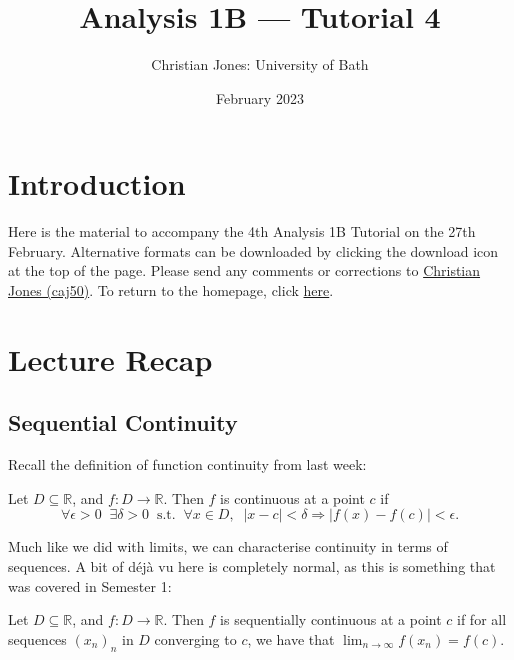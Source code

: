 \documentclass[
  10pt,
  a4paper]{article}
\title{Analysis 1B --- Tutorial 4}
\author{Christian Jones: University of Bath}
\date{February 2023}
\theoremstyle{plain}
\theoremstyle{definition}
\theoremstyle{plain}
\theoremstyle{plain}
\theoremstyle{plain}
\theoremstyle{plain}
\theoremstyle{definition}
\theoremstyle{definition}
\theoremstyle{remark}
\theoremstyle{remark}
\let\BeginKnitrBlock\begin \let\EndKnitrBlock\end
\begin{document}
\maketitle

{
\setcounter{tocdepth}{2}
\tableofcontents
}
\newpage
{}

\hypertarget{introduction}{%
\section*{Introduction}\label{introduction}}

Here is the material to accompany the 4th Analysis 1B Tutorial on the 27th February. Alternative formats can be downloaded by clicking the download icon at the top of the page. Please send any comments or corrections to \href{mailto:caj50@bath.ac.uk}{Christian Jones (caj50)}. To return to the homepage, click \href{http://caj50.github.io/tutoring.html}{here}.

\hypertarget{lecture-recap}{%
\section{Lecture Recap}\label{lecture-recap}}

\hypertarget{sequential-continuity}{%
\subsection{Sequential Continuity}\label{sequential-continuity}}

Recall the definition of function continuity from last week:
\BeginKnitrBlock{definition}[Continuity]
{\label{def:def1} }Let \(D \subseteq \mathbb{R}\), and \(f: D \to \mathbb{R}\). Then \(f\) is continuous at a point \(c\) if \[\forall \epsilon > 0\;\;\exists \delta > 0\;\;\text{s.t.}\;\;\forall x \in D,\;\; \lvert x - c \rvert < \delta \Rightarrow \lvert f(x) - f(c) \rvert < \epsilon.\]
\EndKnitrBlock{definition}
Much like we did with limits, we can characterise continuity in terms of sequences. A bit of déjà vu here is completely normal, as this is something that was covered in Semester 1:

\BeginKnitrBlock{definition}[Sequential Continuity]
{\label{def:def2} }Let \(D \subseteq \mathbb{R}\), and \(f: D \to \mathbb{R}\). Then \(f\) is sequentially continuous at a point \(c\) if for all sequences \((x_n)_n\) in \(D\) converging to \(c\), we have that \(\lim_{n \to \infty}f(x_n) = f(c).\)
\EndKnitrBlock{definition}
\end{document}
